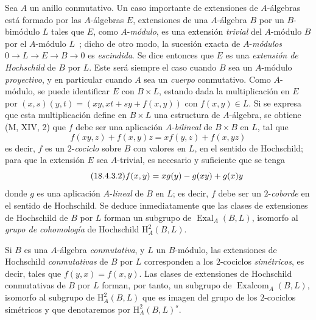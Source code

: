 \begin{env}[18.4.3]
\label{0.18.4.3-fr}
Sea $A$ un anillo conmutativo. Un caso importante de extensiones de
$A$-álgebras está formado por las $A$-álgebras $E$, extensiones de una $A$-álgebra $B$
por un $B$-bimódulo $L$ tales que $E$, como $A$-\emph{módulo}, es una
extensión \emph{trivial} del $A$-módulo $B$ por el $A$-módulo $L$~; dicho de otro
modo, la sucesión exacta de $A$-\emph{módulos}
$0\to L\to E\to B\to0$ es \emph{escindida}. Se dice entonces que $E$ es una
\emph{extensión de Hochschild} de $B$ por $L$. Este será siempre el caso cuando
$B$ sea un $A$-módulo \emph{proyectivo}, y en particular cuando $A$ sea un
\emph{cuerpo} conmutativo. Como $A$-módulo, se puede identificar $E$ con
$B\times L$, estando dada la multiplicación en $E$ por
$(x,s)(y,t)=(xy,xt+sy+f(x,y))$ con $f(x,y)\in L$. Si se expresa que esta
multiplicación define en $B\times L$ una estructura de $A$-álgebra, se obtiene
(M, XIV, 2) que $f$ debe ser una aplicación $A$-\emph{bilineal} de
$B\times B$ en $L$, tal que
\begin{equation}
\label{0.18.4.3.1-fr}
\tag{18.4.3.1}
  f(xy,z)+f(x,y)z=xf(y,z)+f(x,yz)
\end{equation}
es decir, $f$ es un $2$-\emph{cociclo} sobre $B$ con valores en $L$, en el
sentido de Hochschild; para que la extensión $E$ sea $A$-trivial, es necesario
y suficiente que se tenga
\begin{equation}
\label{0.18.4.3.2-fr}
\tag{18.4.3.2}
  f(x,y)=xg(y)- g(xy)+g(x)y
\end{equation}
donde $g$ es una aplicación $A$-\emph{lineal} de $B$ en $L$; es decir, $f$
debe ser un $2$-\emph{coborde} en el sentido de Hochschild. Se deduce
inmediatamente que las clases de extensiones de Hochschild de $B$ por $L$
forman un subgrupo de $\operatorname{Exal}_A(B,L)$, isomorfo al \emph{grupo de
cohomología} de Hochschild $\mathrm H_A^2(B,L)$.

Si $B$ es una $A$-álgebra \emph{conmutativa}, y $L$ un $B$-módulo, las
extensiones de Hochschild \emph{conmutativas} de $B$ por $L$ corresponden a los
$2$-cociclos \emph{simétricos}, es decir, tales que $f(y,x)=f(x,y)$. Las clases
de extensiones de Hochschild conmutativas de $B$ por $L$ forman, por tanto, un
subgrupo de $\operatorname{Exalcom}_A(B,L)$, isomorfo al subgrupo de
$\mathrm H_A^2(B,L)$ que es imagen del grupo de los $2$-cociclos simétricos y
que denotaremos por $\mathrm H_A^2(B,L)^s$.
\end{env}


